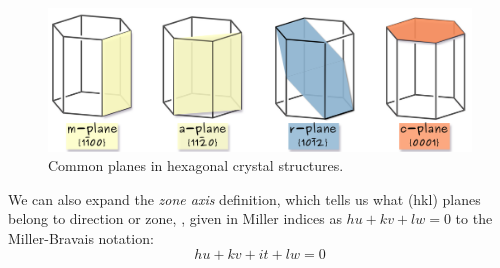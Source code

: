 \begin{figure}[htb]
    \centering
\includegraphics[width=0.85\linewidth]{Figures/hex_planes.png}
\caption{Common planes in hexagonal crystal structures.}
\label{Fig:planes}
\end{figure}
We can also expand the \textit{zone axis} definition, which tells us what \hkl(hkl) planes belong to direction or zone, \hkl[uvw], given in Miller indices as $hu + kv + lw = 0$ to the Miller-Bravais notation:
\begin{equation}
hu + kv + it+ lw = 0
\end{equation}




